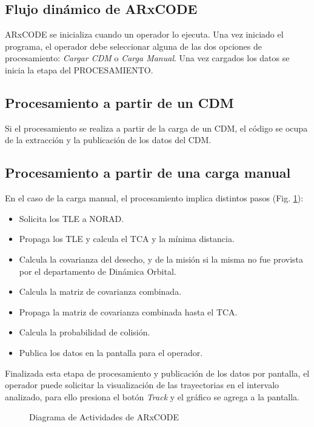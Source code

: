 \subsection{Flujo din\'amico de ARxCODE}

ARxCODE se inicializa cuando un operador lo ejecuta. Una vez iniciado el programa, el operador debe seleccionar alguna de las dos opciones de procesamiento: {\it{Cargar CDM}} o {\it{Carga Manual}}. Una vez cargados los datos se inicia la etapa del PROCESAMIENTO.

\subsection*{Procesamiento a partir de un CDM}
Si el procesamiento se realiza a partir de la carga de un CDM, el c\'odigo se ocupa de la extracci\'on y la publicaci\'on de los datos del CDM. 
\subsection*{Procesamiento a partir de una carga manual}
En el caso de la carga manual, el procesamiento implica distintos pasos (Fig. \ref{fig:actdiag}):
\begin{itemize}
 \item Solicita los TLE a NORAD.
 \item Propaga los TLE y calcula el TCA y la m\'inima distancia.
 \item Calcula la covarianza del desecho, y de la misi\'on si la misma no fue provista por el departamento de Din\'amica Orbital.
 \item Calcula la matriz de covarianza combinada.
 \item Propaga la matriz de covarianza combinada hasta el TCA.
 \item Calcula la probabilidad de colisi\'on.
 \item Publica los datos en la pantalla para el operador.
\end{itemize}

Finalizada esta etapa de procesamiento y publicaci\'on de los datos por pantalla, el operador puede solicitar la visualizaci\'on de las trayectorias en el intervalo analizado, para ello presiona el bot\'on {\it{Track}} y el gr\'afico se agrega a la pantalla.\\

\begin{figure}[h!]
  \centering
  \caption{Diagrama de Actividades de ARxCODE}
  \label{fig:actdiag}
\end{figure}


